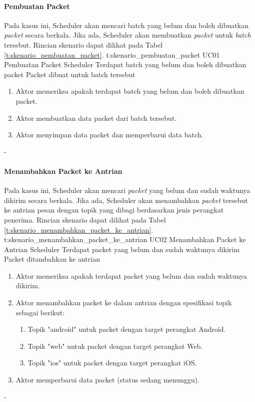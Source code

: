 \paragraph{Pembuatan Packet}
\par Pada kasus ini, Scheduler akan mencari batch yang belum dan boleh dibuatkan \textit{packet} secara berkala. Jika ada, Scheduler akan membuatkan \textit{packet} untuk \textit{batch} tersebut. Rincian skenario dapat dilihat pada Tabel \ref{t:skenario_pembuatan_packet}.
\tableUcDesc
{t:skenario_pembuatan_packet}
{UC01}
{Pembuatan Packet}
{Scheduler}
{Terdapat batch yang belum dan boleh dibuatkan packet}
{Packet dibuat untuk batch tersebut}
{
\begin{enumerate}
    \item Aktor memeriksa apakah terdapat batch yang belum dan boleh dibuatkan packet.
    \item Aktor membuatkan data packet dari batch tersebut.
    \item Aktor menyimpan data packet dan memperbarui data batch.
\end{enumerate}
}
{-}

\paragraph{Menambahkan Packet ke Antrian}
\par Pada kasus ini, Scheduler akan mencari \textit{packet} yang belum dan sudah waktunya dikirim secara berkala. Jika ada, Scheduler akan menambahkan \textit{packet} tersebut ke antrian pesan dengan topik yang dibagi berdasarkan jenis perangkat penerima. Rincian skenario dapat dilihat pada Tabel \ref{t:skenario_menambahkan_packet_ke_antrian}.
\tableUcDesc
{t:skenario_menambahkan_packet_ke_antrian}
{UC02}
{Menambahkan Packet ke Antrian}
{Scheduler}
{Terdapat packet yang belum dan sudah waktunya dikirim}
{Packet ditambahkan ke antrian}
{
\begin{enumerate}
    \item Aktor memeriksa apakah terdapat packet yang belum dan sudah waktunya dikirim.
    \item Aktor menambahkan packet ke dalam antrian dengan spesifikasi topik sebagai berikut:
    \begin{enumerate}
        \item Topik "android" untuk packet dengan target perangkat Android.
        \item Topik "web" untuk packet dengan target perangkat Web.
        \item Topik "ios" untuk packet dengan target perangkat iOS.
    \end{enumerate}
    \item Aktor memperbarui data packet (status sedang menunggu).
\end{enumerate}
}
{-}

